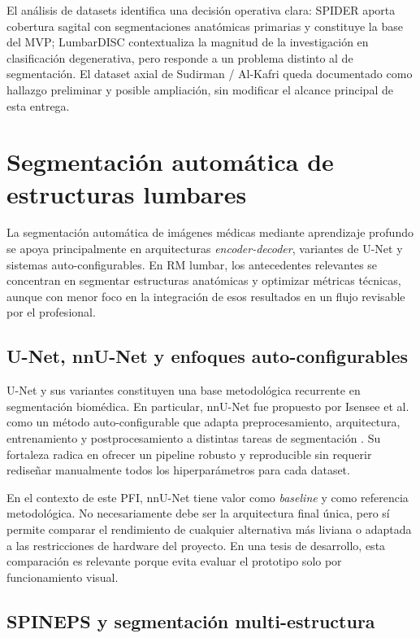 El análisis de datasets identifica una decisión operativa clara: SPIDER aporta cobertura sagital con segmentaciones anatómicas primarias y constituye la base del MVP; LumbarDISC contextualiza la magnitud de la investigación en clasificación degenerativa, pero responde a un problema distinto al de segmentación. El dataset axial de Sudirman / Al-Kafri queda documentado como hallazgo preliminar y posible ampliación, sin modificar el alcance principal de esta entrega.

\section{Segmentación automática de estructuras lumbares}

La segmentación automática de imágenes médicas mediante aprendizaje profundo se apoya principalmente en arquitecturas \textit{encoder-decoder}, variantes de U-Net y sistemas auto-configurables. En RM lumbar, los antecedentes relevantes se concentran en segmentar estructuras anatómicas y optimizar métricas técnicas, aunque con menor foco en la integración de esos resultados en un flujo revisable por el profesional.

\subsection{U-Net, nnU-Net y enfoques auto-configurables}

U-Net y sus variantes constituyen una base metodológica recurrente en segmentación biomédica. En particular, nnU-Net fue propuesto por Isensee et al. como un método auto-configurable que adapta preprocesamiento, arquitectura, entrenamiento y postprocesamiento a distintas tareas de segmentación \parencite{isensee_nnunet_2021}. Su fortaleza radica en ofrecer un pipeline robusto y reproducible sin requerir rediseñar manualmente todos los hiperparámetros para cada dataset.

En el contexto de este PFI, nnU-Net tiene valor como \textit{baseline} y como referencia metodológica. No necesariamente debe ser la arquitectura final única, pero sí permite comparar el rendimiento de cualquier alternativa más liviana o adaptada a las restricciones de hardware del proyecto. En una tesis de desarrollo, esta comparación es relevante porque evita evaluar el prototipo solo por funcionamiento visual.

\subsection{SPINEPS y segmentación multi-estructura}

